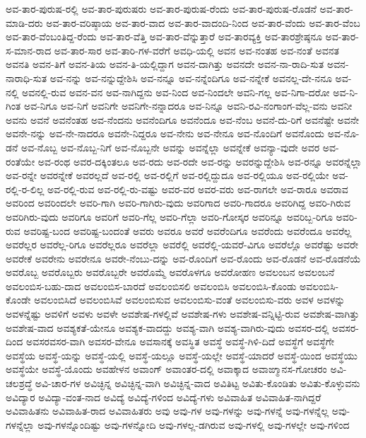{ಅವ-ತಾರ-ಪುರುಷ-ರಲ್ಲಿ
ಅವ-ತಾರ-ಪುರುಷರು
ಅವ-ತಾರ-ಪುರುಷ-ರೆಂದು
ಅವ-ತಾರ-ಪುರುಷ-ರೊಡನೆ
ಅವ-ತಾರ-ಮಾಡಿ-ದರು
ಅವ-ತಾರ-ವರಿಷ್ಠಾಯ
ಅವ-ತಾರ-ವಾದ
ಅವ-ತಾರ-ವಾದಂದಿ-ನಿಂದ
ಅವ-ತಾರ-ವೆಂದು
ಅವ-ತಾರ-ವೆಂಬ
ಅವ-ತಾರ-ವೆಂಬಂತಿದ್ದ-ರೆಂದು
ಅವ-ತಾರ-ವೆತ್ತಿ
ಅವ-ತಾರ-ವೆನ್ನುತ್ತಾರೆ
ಅವ-ತಾರವ್ಯಕ್ತಿ
ಅವ-ತಾರಶ್ರೇಷ್ಠನೂ
ಅವ-ತಾರ-ಸ-ಮಾನ-ರಾದ
ಅವ-ತಾರ-ಸಾರ
ಅವ-ತಾರಿ-ಗಳ-ವರೆಗೆ
ಅವಧಿ-ಯಲ್ಲಿ
ಅವನ
ಅವ-ನಂತಹ
ಅವ-ನಂತೆ
ಅವನತ
ಅವನತಿ
ಅವನ-ತಿಗೆ
ಅವನ-ತಿಯ
ಅವನ-ತಿ-ಯಲ್ಲಿದ್ದಾಗ
ಅವನ-ದಾಗಿತ್ತು
ಅವನದೇ
ಅವನ-ನಾ-ರಾದಿ-ಸುತ
ಅವನ-ನಾರಾಧಿ-ಸುತ
ಅವ-ನನ್ನು
ಅವ-ನನ್ನುದ್ದೇಶಿಸಿ
ಅವ-ನನ್ನೂ
ಅವ-ನನ್ನೆಂದಿಗೂ
ಅವ-ನನ್ನೇಕೆ
ಅವನಲ್ಲ-ದೇ-ನನೂ
ಅವ-ನಲ್ಲಿ
ಅವನಲ್ಲಿ-ರುವ
ಅವನ-ವನ
ಅವ-ನಾಗಿದ್ದನು
ಅವ-ನಿಂದ
ಅವ-ನಿಂದಲೇ
ಅವನಿ-ಗಲ್ಲ
ಅವ-ನಿಗಾ-ದರೋ
ಅವ-ನಿ-ಗಿಂತ
ಅವ-ನಿಗೂ
ಅವ-ನಿಗೆ
ಅವನಿಗೇ
ಅವನಿಗೇ-ನನ್ನಾದರೂ
ಅವ-ನಿನ್ನೂ
ಅವನಿ-ರವಿ-ನಂಗಾಂಗ-ವೆಲ್ಲ-ವನು
ಅವನೀ
ಅವನು
ಅವನೆ
ಅವನೆಂತಹ
ಅವ-ನೆಂದನು
ಅವನೆಂದಿಗೂ
ಅವನೆಂದೂ
ಅವ-ನೆಂಬ
ಅವನೆ-ದು-ರಿಗೆ
ಅವನೆಷ್ಟೇ
ಅವನೇ
ಅವನೇ-ನನ್ನು
ಅವ-ನೇ-ನಾದರೂ
ಅವನೇ-ನಿದ್ದರೂ
ಅವ-ನೇನು
ಅವ-ನೇನೂ
ಅವ-ನೊಂದಿಗೆ
ಅವನೊಂದು
ಅವ-ನೊ-ಡನೆ
ಅವ-ನೊಬ್ಬ
ಅವ-ನೊಬ್ಬ-ನಿಗೆ
ಅವ-ನೊಬ್ಬನೇ
ಅವನ್ನು
ಅವನ್ನೆಲ್ಲಾ
ಅವನ್ನೇಕೆ
ಅವನ್ಯಾ-ವುದೇ
ಅವರ
ಅವ-ರಂತೆಯೇ
ಅವ-ರಂಥ
ಅವರ-ದಕ್ಕಿಂತಲೂ
ಅವ-ರದು
ಅವ-ರದೇ
ಅವ-ರನ್ನು
ಅವರನ್ನುದ್ದೇಶಿಸಿ
ಅವ-ರನ್ನೂ
ಅವರನ್ನೆಲ್ಲಾ
ಅವ-ರನ್ನೇ
ಅವರನ್ನೇಕೆ
ಅವರಲ್ಲದೆ
ಅವ-ರಲ್ಲಿ
ಅವ-ರಲ್ಲಿಗೆ
ಅವ-ರಲ್ಲಿದ್ದುದೂ
ಅವ-ರಲ್ಲಿಯೂ
ಅವ-ರಲ್ಲಿಯೇ
ಅವ-ರಲ್ಲಿ-ರ-ಲಿಲ್ಲ
ಅವ-ರಲ್ಲಿ-ರುವ
ಅವ-ರಲ್ಲಿ-ರು-ವಷ್ಟು
ಅವರ-ವರ
ಅವರ-ವರು
ಅವ-ರಾಗಲೇ
ಅವ-ರಾರೂ
ಅವರಾವ
ಅವರಿಂದ
ಅವರಿಂದಲೇ
ಅವರಿ-ಗಾಗಿ
ಅವರಿ-ಗಾಗಿರು-ವುದು
ಅವರಿಗಾದ
ಅವರಿ-ಗಾದರೂ
ಅವರಿಗಿದ್ದ
ಅವರಿ-ಗಿರುವ
ಅವರಿಗಿರು-ವುದು
ಅವರಿಗೂ
ಅವರಿಗೆ
ಅವರಿ-ಗೆಲ್ಲ
ಅವರಿ-ಗೆಲ್ಲಾ
ಅವರಿ-ಗೋಸ್ಕರ
ಅವರಿನ್ನೂ
ಅವರಿಬ್ಬ-ರಿಗೂ
ಅವರಿ-ರುವ
ಅವರಿಷ್ಟ-ಬಂದ
ಅವರಿಷ್ಟ-ಬಂದಂತೆ
ಅವರು
ಅವರೂ
ಅವರೆ
ಅವರೆಂದಿಗೂ
ಅವರೆಂದು
ಅವರೆಂದೂ
ಅವರೆಲ್ಲ
ಅವರೆಲ್ಲರ
ಅವರೆಲ್ಲ-ರಿಗೂ
ಅವರೆಲ್ಲರೂ
ಅವರೆಲ್ಲಾ
ಅವರೆಲ್ಲಿ
ಅವರೆಲ್ಲಿ-ಯವರೆ-ವಿಗೂ
ಅವರೆಲ್ಲೊ
ಅವರೆಷ್ಟು
ಅವರೇ
ಅವರೇಕೆ
ಅವರೇನು
ಅವರೇನೂ
ಅವರೇ-ನೆಂಬು-ದನ್ನು
ಅವ-ರೊಂದಿಗೆ
ಅವ-ರೊಂದು
ಅವ-ರೊಡನೆ
ಅವ-ರೊಡನೆಯೆ
ಅವರೊಬ್ಬ
ಅವರೊಬ್ಬರು
ಅವರೊಬ್ಬರೇ
ಅವರೊಮ್ಮೆ
ಅವರೊಳಗೂ
ಅವರೋಹಣ
ಅವಲಂಬನ
ಅವಲಂಬನೆ
ಅವಲಂಬಿಸ-ಬಹು-ದಾದ
ಅವಲಂಬಿಸ-ಬಾರದೆ
ಅವಲಂಬಿಸಲಿ
ಅವಲಂಬಿಸಿ
ಅವಲಂಬಿಸಿ-ಕೊಂಡು
ಅವಲಂಬಿಸಿ-ಕೊಂಡೇ
ಅವಲಂಬಿಸಿದೆ
ಅವಲಂಬಿಸಿವೆ
ಅವಲಂಬಿಸುವ
ಅವಲಂಬಿಸು-ವಂತೆ
ಅವಲಂಬಿಸು-ವರು
ಅವಳ
ಅವಳನ್ನು
ಅವಳನ್ನೆಷ್ಟು
ಅವಳಿಗೆ
ಅವಳು
ಅವಳೇ
ಅವಶೇಷ-ಗಳಲ್ಲಿವೆ
ಅವಶೇಷ-ಗಳು
ಅವಶೇಷ-ವನ್ನಿಟ್ಟಿ-ರುವ
ಅವಶೇಷ-ವಾಗಿತ್ತು
ಅವಶೇಷ-ವಾದ
ಅವಶ್ಯಕತೆ-ಯೇನೂ
ಅವಶ್ಯಕ-ವಾದದ್ದು
ಅವಶ್ಯ-ವಾಗಿ
ಅವಶ್ಯ-ವಾಗಿರು-ವುದು
ಅವಸರ-ದಲ್ಲಿ
ಅವಸರ-ದಿಂದ
ಅವಸರವಸರ-ವಾಗಿ
ಅವಸರ-ವೇನೂ
ಅವಸಾನಕ್ಕೆ
ಅವಸ್ಥಿತ
ಅವಸ್ಥೆ
ಅವಸ್ಥೆ-ಗಿಳಿ-ದಿದೆ
ಅವಸ್ಥೆಗೆ
ಅವಸ್ಥೆಗೇ
ಅವಸ್ಥೆಯ
ಅವಸ್ಥೆ-ಯನ್ನು
ಅವಸ್ಥೆ-ಯಲ್ಲಿ
ಅವಸ್ಥೆ-ಯಲ್ಲೂ
ಅವಸ್ಥೆ-ಯಲ್ಲೇ
ಅವಸ್ಥೆ-ಯಾದರೆ
ಅವಸ್ಥೆ-ಯಿಂದ
ಅವಸ್ಥೆಯು
ಅವಸ್ಥೆಯೇ
ಅವಸ್ಥೆ-ಯೊಂದು
ಅವಹೇಳನ
ಅವಾಂಗ್
ಅವಾಂತರ-ದಲ್ಲಿ
ಅವಾಕ್ಕಾದ
ಅವಾಙ್ಮಾನಸ-ಗೋಚರಂ
ಅವಿ-ಚಲಶ್ರದ್ಧೆ
ಅವಿ-ಚಾರ-ಗಳ
ಅವಿಚ್ಛಿನ್ನ
ಅವಿಚ್ಛಿನ್ನ-ವಾಗಿ
ಅವಿಚ್ಛಿನ್ನ-ವಾದ
ಅವಿತಿಟ್ಟ
ಅವಿತು-ಕೊಂಡಿತು
ಅವಿತು-ಕೊಳ್ಳುವನು
ಅವಿದ್ಯಾರ
ಅವಿದ್ಯಾ-ವಂತ-ನಾದ
ಅವಿದ್ಯೆ
ಅವಿದ್ಯೆ-ಗಳಿಂದ
ಅವಿದ್ಯೆ-ಗಳು
ಅವಿವಾಹಿತ
ಅವಿವಾಹಿತ-ನಾಗಿದ್ದರೆ
ಅವಿವಾಹಿತನು
ಅವಿವಾಹಿತ-ರಾದ
ಅವಿವಾಹಿತರು
ಅವು
ಅವು-ಗಳ
ಅವು-ಗಳನ್ನು
ಅವು-ಗಳನ್ನೆ
ಅವು-ಗಳನ್ನೆಲ್ಲ
ಅವು-ಗಳನ್ನೆಲ್ಲಾ
ಅವು-ಗಳನ್ನೊಂದಿಷ್ಟು
ಅವು-ಗಳನ್ನೋದಿ
ಅವು-ಗಳಲ್ಲ-ಡಗಿರುವ
ಅವು-ಗಳಲ್ಲಿ
ಅವು-ಗಳಲ್ಲೇ
ಅವು-ಗಳಿಂದ
}
